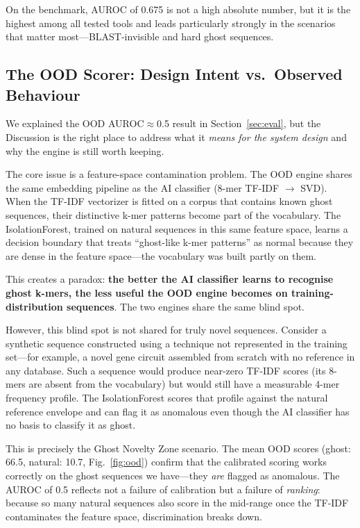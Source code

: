 \documentclass[conference]{IEEEtran}
\begin{document}
On the benchmark, AUROC of 0.675 is not a high absolute number, but it is the highest among all tested tools and leads particularly strongly in the scenarios that matter most---BLAST-invisible and hard ghost sequences.

\subsection{The OOD Scorer: Design Intent vs.\ Observed Behaviour}

We explained the OOD AUROC$\approx$0.5 result in Section~\ref{sec:eval}, but the Discussion is the right place to address what it \emph{means for the system design} and why the engine is still worth keeping.

The core issue is a feature-space contamination problem. The OOD engine shares the same embedding pipeline as the AI classifier (8-mer TF-IDF $\to$ SVD). When the TF-IDF vectorizer is fitted on a corpus that contains known ghost sequences, their distinctive k-mer patterns become part of the vocabulary. The IsolationForest, trained on natural sequences in this same feature space, learns a decision boundary that treats ``ghost-like k-mer patterns'' as normal because they are dense in the feature space---the vocabulary was built partly on them.

This creates a paradox: \textbf{the better the AI classifier learns to recognise ghost k-mers, the less useful the OOD engine becomes on training-distribution sequences}. The two engines share the same blind spot.

However, this blind spot is not shared for truly novel sequences. Consider a synthetic sequence constructed using a technique not represented in the training set---for example, a novel gene circuit assembled from scratch with no reference in any database. Such a sequence would produce near-zero TF-IDF scores (its 8-mers are absent from the vocabulary) but would still have a measurable 4-mer frequency profile. The IsolationForest scores that profile against the natural reference envelope and can flag it as anomalous even though the AI classifier has no basis to classify it as ghost.

This is precisely the Ghost Novelty Zone scenario. The mean OOD scores (ghost: 66.5, natural: 10.7, Fig.~\ref{fig:ood}) confirm that the calibrated scoring works correctly on the ghost sequences we have---they \emph{are} flagged as anomalous. The AUROC of 0.5 reflects not a failure of calibration but a failure of \emph{ranking}: because so many natural sequences also score in the mid-range once the TF-IDF contaminates the feature space, discrimination breaks down.
\end{document}
